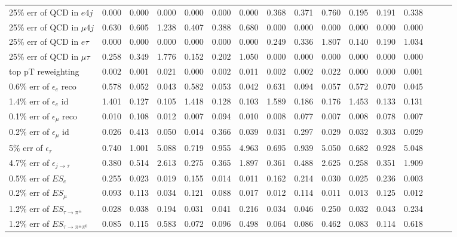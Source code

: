 \begin{sidewaystable}[p]
\begin{tabular}{|l|ccc|ccc|ccc|ccc|ccc|}
  25$\%$ err of QCD in $e 4j$                & 0.000 & 0.000 & 0.000 & 0.000 & 0.000 & 0.000 & 0.368 & 0.371 & 0.760 & 0.195 & 0.191 & 0.338 \\ 
  25$\%$ err of QCD in $\mu 4j$              & 0.630 & 0.605 & 1.238 & 0.407 & 0.388 & 0.680 & 0.000 & 0.000 & 0.000 & 0.000 & 0.000 & 0.000 \\ 
  25$\%$ err of QCD in $e\tau$               & 0.000 & 0.000 & 0.000 & 0.000 & 0.000 & 0.000 & 0.249 & 0.336 & 1.807 & 0.140 & 0.190 & 1.034 \\ 
  25$\%$ err of QCD in $\mu\tau$             & 0.258 & 0.349 & 1.776 & 0.152 & 0.202 & 1.050 & 0.000 & 0.000 & 0.000 & 0.000 & 0.000 & 0.000 \\ 
  top pT reweighting                         & 0.002 & 0.001 & 0.021 & 0.000 & 0.002 & 0.011 & 0.002 & 0.002 & 0.022 & 0.000 & 0.000 & 0.001 \\ 
  0.6$\%$ err of $\epsilon_e$ reco           & 0.578 & 0.052 & 0.043 & 0.582 & 0.053 & 0.042 & 0.631 & 0.094 & 0.057 & 0.572 & 0.070 & 0.045 \\ 
  1.4$\%$ err of $\epsilon_e$ id             & 1.401 & 0.127 & 0.105 & 1.418 & 0.128 & 0.103 & 1.589 & 0.186 & 0.176 & 1.453 & 0.133 & 0.131 \\ 
  0.1$\%$ err of $\epsilon_\mu$ reco         & 0.010 & 0.108 & 0.012 & 0.007 & 0.094 & 0.010 & 0.008 & 0.077 & 0.007 & 0.008 & 0.078 & 0.007 \\ 
  0.2$\%$ err of $\epsilon_\mu$ id           & 0.026 & 0.413 & 0.050 & 0.014 & 0.366 & 0.039 & 0.031 & 0.297 & 0.029 & 0.032 & 0.303 & 0.029 \\ 
  5$\%$ err of $\epsilon_\tau$               & 0.740 & 1.001 & 5.088 & 0.719 & 0.955 & 4.963 & 0.695 & 0.939 & 5.050 & 0.682 & 0.928 & 5.048 \\ 
  4.7$\%$ err of $\epsilon_{j\to\tau}$       & 0.380 & 0.514 & 2.613 & 0.275 & 0.365 & 1.897 & 0.361 & 0.488 & 2.625 & 0.258 & 0.351 & 1.909 \\ 
  0.5$\%$ err of $ES_{e}$                    & 0.255 & 0.023 & 0.019 & 0.155 & 0.014 & 0.011 & 0.162 & 0.214 & 0.030 & 0.025 & 0.236 & 0.003 \\ 
  0.2$\%$ err of $ES_{\mu}$                  & 0.093 & 0.113 & 0.034 & 0.121 & 0.088 & 0.017 & 0.012 & 0.114 & 0.011 & 0.013 & 0.125 & 0.012 \\ 
  1.2$\%$ err of $ES_{\tau\to\pi^\pm}$       & 0.028 & 0.038 & 0.194 & 0.031 & 0.041 & 0.216 & 0.034 & 0.046 & 0.250 & 0.032 & 0.043 & 0.234 \\ 
  1.2$\%$ err of $ES_{\tau\to\pi^\pm\pi^0}$  & 0.085 & 0.115 & 0.583 & 0.072 & 0.096 & 0.498 & 0.064 & 0.086 & 0.462 & 0.083 & 0.114 & 0.618 \\ 

\end{tabular}
\end{sidewaystable}
